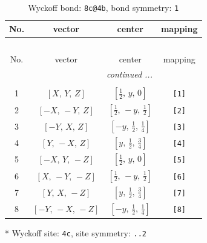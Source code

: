 \documentclass[fleqn,8pt]{jsarticle}
\begin{document}
\renewcommand{\arraystretch}{1.2}
\begin{longtable}{cccc}
\caption{Wyckoff bond: {\tt 8c@4b}, bond symmetry: {\tt 1}}
 \\
 \hline \hline
No. & vector & center & mapping \\ \hline \endfirsthead

\multicolumn{3}{l}{\tablename\ \thetable{}} \\
 \hline \hline
No. & vector & center & mapping \\ \hline \endhead

 \hline \hline
\multicolumn{3}{r}{\footnotesize\it continued ...} \\ \endfoot

 \hline \hline
\multicolumn{3}{r}{} \\ \endlastfoot

1 & $\left[ X,\, Y,\, Z \right]$ & $\left[ \frac{1}{2},\, y,\, 0 \right]$ & {\tt [1]} \\ \hline
2 & $\left[ - X,\, - Y,\, Z \right]$ & $\left[ \frac{1}{2},\, - y,\, \frac{1}{2} \right]$ & {\tt [2]} \\ \hline
3 & $\left[ - Y,\, X,\, Z \right]$ & $\left[ - y,\, \frac{1}{2},\, \frac{1}{4} \right]$ & {\tt [3]} \\ \hline
4 & $\left[ Y,\, - X,\, Z \right]$ & $\left[ y,\, \frac{1}{2},\, \frac{3}{4} \right]$ & {\tt [4]} \\ \hline
5 & $\left[ - X,\, Y,\, - Z \right]$ & $\left[ \frac{1}{2},\, y,\, 0 \right]$ & {\tt [5]} \\ \hline
6 & $\left[ X,\, - Y,\, - Z \right]$ & $\left[ \frac{1}{2},\, - y,\, \frac{1}{2} \right]$ & {\tt [6]} \\ \hline
7 & $\left[ Y,\, X,\, - Z \right]$ & $\left[ y,\, \frac{1}{2},\, \frac{3}{4} \right]$ & {\tt [7]} \\ \hline
8 & $\left[ - Y,\, - X,\, - Z \right]$ & $\left[ - y,\, \frac{1}{2},\, \frac{1}{4} \right]$ & {\tt [8]} \\
\end{longtable}
* Wyckoff site: {\tt 4c}, site symmetry: {\tt ..2}
\renewcommand{\arraystretch}{1.2}
\end{document}
